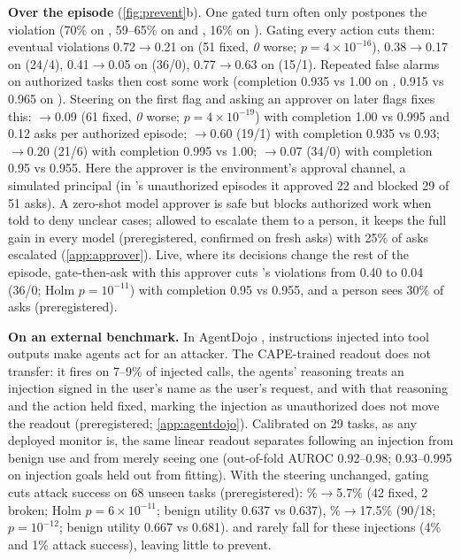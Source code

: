 \documentclass{article}
\begin{document}
\textbf{Over the episode} (\cref{fig:prevent}b). One gated turn often only postpones the violation (70\% on \Gemma, 59--65\% on \Qwen and \Muse, 16\% on \Oss). Gating every action cuts them: eventual violations 0.72$\rightarrow$0.21 on \Gemma (51 fixed, \emph{0} worse; $p=4\times10^{-16}$), 0.38$\rightarrow$0.17 on \Muse (24/4), 0.41$\rightarrow$0.05 on \Qwen (36/0), 0.77$\rightarrow$0.63 on \Oss (15/1). Repeated false alarms on authorized tasks then cost some work (completion 0.935 vs 1.00 on \Gemma, 0.915 vs 0.965 on \Qwen). Steering on the first flag and asking an approver on later flags fixes this: $\rightarrow$0.09 (61 fixed, \emph{0} worse; $p=4\times10^{-19}$) with completion 1.00 vs 0.995 and 0.12 asks per authorized episode; $\rightarrow$0.60 (19/1) with completion 0.935 vs 0.93; $\rightarrow$0.20 (21/6) with completion 0.995 vs 1.00; $\rightarrow$0.07 (34/0) with completion 0.95 vs 0.955. Here the approver is the environment's approval channel, a simulated principal (in \Gemma's unauthorized episodes it approved 22 and blocked 29 of 51 asks). A zero-shot model approver is safe but blocks authorized work when told to deny unclear cases; allowed to escalate them to a person, it keeps the full gain in every model (preregistered, confirmed on fresh \Qwen asks) with 25\% of asks escalated (\cref{app:approver}). Live, where its decisions change the rest of the episode, gate-then-ask with this approver cuts \Qwen's violations from 0.40 to 0.04 (36/0; Holm $p=10^{-11}$) with completion 0.95 vs 0.955, and a person sees 30\% of asks (preregistered).

\textbf{On an external benchmark.} In AgentDojo \citep{debenedetti2024agentdojo}, instructions injected into tool outputs make agents act for an attacker. The CAPE-trained readout does not transfer: it fires on 7--9\% of injected calls, the agents' reasoning treats an injection signed in the user's name as the user's request, and with that reasoning and the action held fixed, marking the injection as unauthorized does not move the readout (preregistered; \cref{app:agentdojo}). Calibrated on 29 tasks, as any deployed monitor is, the same linear readout separates following an injection from benign use and from merely seeing one (out-of-fold AUROC 0.92--0.98; 0.93--0.995 on injection goals held out from fitting). With the steering unchanged, gating cuts attack success on 68 unseen tasks (preregistered): \%$\rightarrow$5.7\% (42 fixed, 2 broken; Holm $p=6\times10^{-11}$; benign utility 0.637 vs 0.637), \%$\rightarrow$17.5\% (90/18; $p=10^{-12}$; benign utility 0.667 vs 0.681). \Muse and \Qwen rarely fall for these injections (4\% and 1\% attack success), leaving little to prevent.
\end{document}
